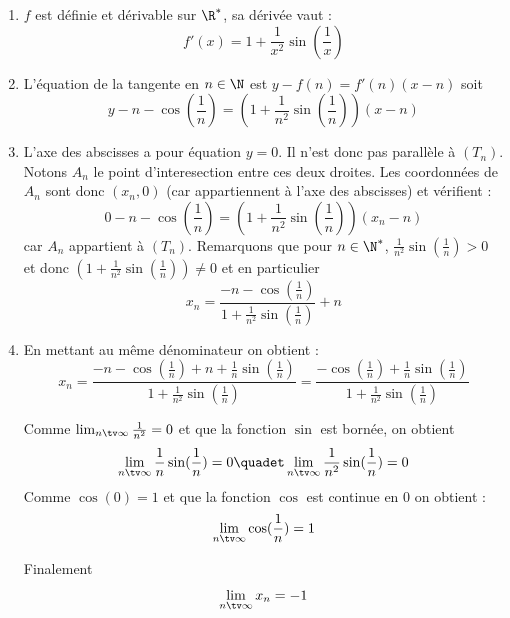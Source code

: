 \begin{correction}
\begin{enumerate}
\item $f$ est définie et dérivable sur $\R^*$, sa dérivée vaut :
$$f'(x) = 1 + \frac{1}{x^2}\sin(\frac{1}{x})$$
\item L'équation de la tangente en $n\in \N$ est 
$ y- f(n) = f'(n) (x-n)$
soit 
$$y -n -\cos(\frac{1}{n}) = ( 1 + \frac{1}{n^2}\sin(\frac{1}{n}))(x-n)$$
\item L'axe des abscisses a pour équation $y=0$. Il n'est donc pas parallèle à $(T_n)$. Notons $A_n$ le point d'interesection entre ces deux droites. 
Les coordonnées de $A_n$ sont donc $(x_n,0)$ (car appartiennent à l'axe des abscisses) et vérifient : 
$$  0-n -\cos(\frac{1}{n}) = ( 1 + \frac{1}{n^2}\sin(\frac{1}{n}))(x_n-n)$$
car $A_n$ appartient à $(T_n)$. Remarquons que pour $n\in \N^*$, $\frac{1}{n^2}\sin(\frac{1}{n})>0 $ et donc $( 1 + \frac{1}{n^2}\sin(\frac{1}{n})) \neq 0$ et en particulier $$x_n =  \frac{-n -\cos(\frac{1}{n})}{ 1 + \frac{1}{n^2}\sin(\frac{1}{n}) }+n$$

\item En mettant au même dénominateur on obtient : 
$$x_n = \frac{-n -\cos(\frac{1}{n}) +n +\frac{1}{n}\sin(\frac{1}{n})}{ 1 + \frac{1}{n^2}\sin(\frac{1}{n}) }=\frac{ -\cos(\frac{1}{n}) +\frac{1}{n}\sin(\frac{1}{n})}{ 1 + \frac{1}{n^2}\sin(\frac{1}{n}) } $$

Comme $ \lim_{n\tv \infty} \frac{1}{n^2} = 0$ et que la fonction $\sin$  est bornée, on obtient 
$$ \lim_{n\tv \infty} \frac{1}{n}\sin(\frac{1}{n})=0\quadet \lim_{n\tv \infty}  \frac{1}{n^2}\sin(\frac{1}{n})= 0$$
Comme $\cos(0)=1$ et que la fonction $\cos$ est continue en $0$ on obtient : 
$$  \lim_{n\tv \infty} \cos(\frac{1}{n}) = 1$$

Finalement $$ \lim_{n\tv \infty} x_n =-1$$


\end{enumerate}
\end{correction}









